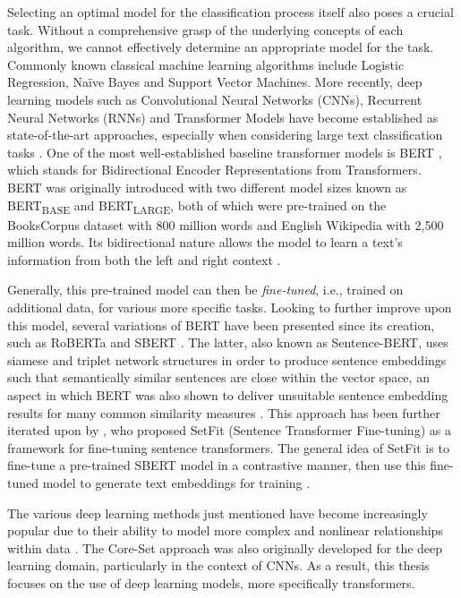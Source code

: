 \documentclass[english,bachelor,ul]{webisthesis} %
\begin{document}
Selecting an optimal model for the classification process itself also poses a crucial task. Without a comprehensive grasp of the underlying concepts of each algorithm, we cannot effectively determine an appropriate model for the task. Commonly known classical machine learning algorithms include Logistic Regression, Na\"ive Bayes and Support Vector Machines. More recently, deep learning models such as Convolutional Neural Networks (CNNs), Recurrent Neural Networks (RNNs) and Transformer Models have become established as state-of-the-art approaches, especially when considering large text classification tasks \citep{chen2015convolutional, DBLP:conf/ijcai/LiuQH16, DBLP:conf/aaai/LaiXLZ15, DBLP:conf/naacl/DevlinCLT19, DBLP:conf/cncl/SunQXH19}. One of the most well-established baseline transformer models is BERT \citep{DBLP:conf/naacl/DevlinCLT19}, which stands for Bidirectional Encoder Representations from Transformers. BERT was originally introduced with two different model sizes known as BERT\textsubscript{BASE} and BERT\textsubscript{LARGE}, both of which were pre-trained on the BooksCorpus dataset \citep{DBLP:conf/iccv/ZhuKZSUTF15} with 800 million words and English Wikipedia with 2,500 million words. Its bidirectional nature allows the model to learn a text's information from both the left and right context \citep{DBLP:conf/naacl/DevlinCLT19}. 

Generally, this pre-trained model can then be \textit{fine-tuned}, i.e., trained on additional data, for various more specific tasks. Looking to further improve upon this model, several variations of BERT have been presented since its creation, such as RoBERTa \citep{DBLP:journals/corr/abs-1907-11692} and SBERT \citep{DBLP:conf/emnlp/ReimersG19}. The latter, also known as Sentence-BERT, uses siamese and triplet network structures in order to produce sentence embeddings such that semantically similar sentences are close within the vector space, an aspect in which BERT was also shown to deliver unsuitable sentence embedding results for many common similarity measures \citep{DBLP:conf/emnlp/ReimersG19}. This approach has been further iterated upon by \cite{DBLP:setfit}, who proposed SetFit (Sentence Transformer Fine-tuning) as a framework for fine-tuning sentence transformers. The general idea of SetFit is to fine-tune a pre-trained SBERT model in a contrastive manner, then use this fine-tuned model to generate text embeddings for training \citep{DBLP:setfit}. 

The various deep learning methods just mentioned have become increasingly popular due to their ability to model more complex and nonlinear relationships within data \citep{DBLP:journals/nature/LeCunBH15}.
The Core-Set approach was also originally developed for the deep learning domain, particularly in the context of CNNs. As a result, this thesis focuses on the use of deep learning models, more specifically transformers.
\end{document}
